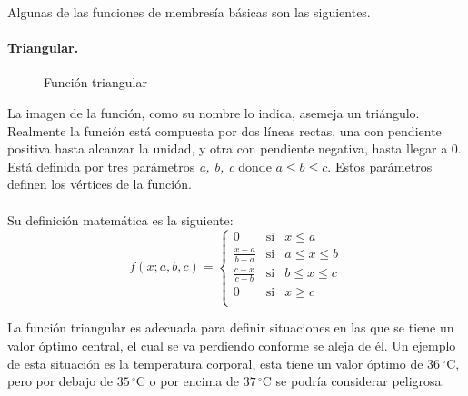 Algunas de las funciones de membresía básicas son las siguientes.

\paragraph{Triangular.}
\begin{figure}
	\captionsetup{margin=1cm,justification=centering}	
	\caption{Función triangular}
	\label{fig:trimf}
\end{figure}
La imagen de la función, como su nombre lo indica, asemeja un triángulo. Realmente la función está compuesta por dos líneas rectas, una con pendiente positiva hasta alcanzar la unidad, y otra con pendiente negativa, hasta llegar a 0. Está definida por tres parámetros \textit{a, b, c} donde $ a \leq b \leq c$. Estos parámetros definen los vértices de la función.\\\\
Su definición matemática es la siguiente:
$$  f(x;a,b,c)= \left\lbrace \begin{array}{lcl}
0	& \mbox{si} & x  \leq a \\ [.30cm]
{\displaystyle \frac{x-a}{b-a}} & \mbox{si} & a \leq x \leq b \\ [.45cm]
{\displaystyle \frac{c-x}{c-b}} & \mbox{si} & b \leq x \leq c \\ [.45cm]
0 & \mbox{si} & x \geq c \\
\end{array}				
\right.
$$

La función triangular es adecuada para definir situaciones en las que se tiene un valor óptimo central, el cual se va perdiendo conforme se aleja de él. Un ejemplo de esta situación es la temperatura corporal, esta tiene un valor óptimo de $36\,^{\circ}\mathrm{C}$, pero por debajo de $35\,^{\circ}\mathrm{C}$ o por encima de $37\,^{\circ}\mathrm{C}$ se podría considerar peligrosa.


